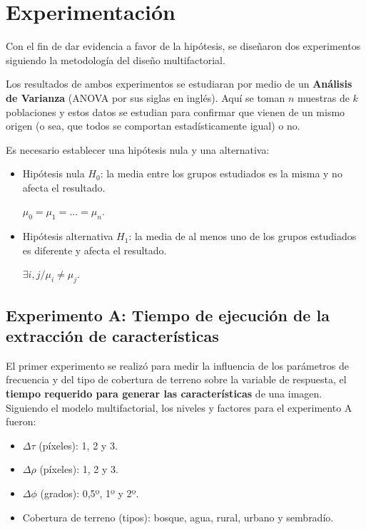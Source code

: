 \chapter{Experimentación} 

Con el fin de dar evidencia a favor de la hipótesis, se diseñaron dos experimentos siguiendo la metodología del diseño multifactorial\cite{Montgomery2001}.

Los resultados de ambos experimentos se estudiaran por medio de un \textbf{Análisis de Varianza}\cite{Montgomery2001} (ANOVA por sus siglas en inglés). Aquí se toman $n$ muestras de $k$ poblaciones y estos datos se estudian para confirmar que vienen de un mismo origen (o sea, que todos se comportan estadísticamente igual) o no.

Es necesario establecer una hipótesis nula y una alternativa:
\begin{itemize}
    \item Hipótesis nula $H_0$: la media entre los grupos estudiados es la misma y no afecta el resultado.
    
    $\mu_0 = \mu_1 = ... = \mu_n$.
    \item Hipótesis alternativa $H_1$: la media de al menos uno de los grupos estudiados es diferente y afecta el resultado.
    
    $\exists i,j / \mu_i \neq \mu_j$.
\end{itemize}


\section{Experimento A: Tiempo de ejecución de la extracción de características}

El primer experimento se realizó para medir la influencia de los parámetros de frecuencia y del tipo de cobertura de terreno sobre la variable de respuesta, el \textbf{tiempo requerido para generar las características} de una imagen. Siguiendo el modelo multifactorial\cite{Montgomery2001}, los niveles y factores para el experimento A fueron:
\begin{itemize}
    \item $\Delta \tau$ (píxeles): 1, 2 y 3.
    \item $\Delta \rho$ (píxeles): 1, 2 y 3.
    \item $\Delta \phi$ (grados): 0,5º, 1º y 2º.
    \item Cobertura de terreno (tipos): bosque, agua, rural, urbano y sembradío.
\end{itemize}

